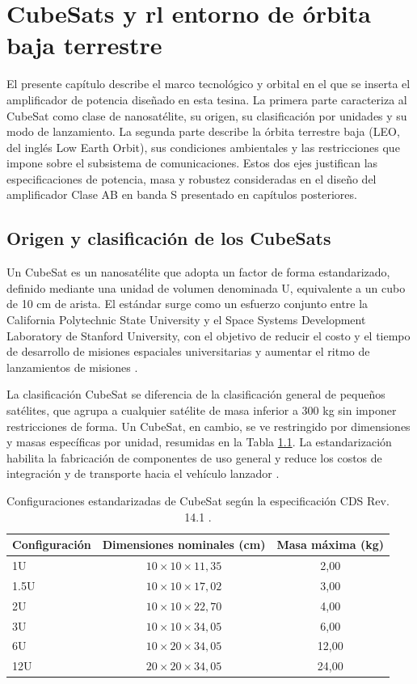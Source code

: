 \chapter{CubeSats y rl entorno de órbita baja terrestre} \label{chap:cubesat_leo}
El presente capítulo describe el marco tecnológico y orbital en el que se inserta el amplificador de potencia diseñado en esta tesina. La primera parte caracteriza al CubeSat como clase de nanosatélite, su origen, su clasificación por unidades y su modo de lanzamiento. La segunda parte describe la órbita terrestre baja (LEO, del inglés Low Earth Orbit), sus condiciones ambientales y las restricciones que impone sobre el subsistema de comunicaciones. Estos dos ejes justifican las especificaciones de potencia, masa y robustez consideradas en el diseño del amplificador Clase AB en banda S presentado en capítulos posteriores.

\section{Origen y clasificación de los CubeSats}
Un CubeSat es un nanosatélite que adopta un factor de forma estandarizado, definido mediante una unidad de volumen denominada U, equivalente a un cubo de 10 cm de arista. El estándar surge como un esfuerzo conjunto entre la California Polytechnic State University y el Space Systems Development Laboratory de Stanford University, con el objetivo de reducir el costo y el tiempo de desarrollo de misiones espaciales universitarias y aumentar el ritmo de lanzamientos de misiones \cite{cubesatspecs}.

La clasificación CubeSat se diferencia de la clasificación general de pequeños satélites, que agrupa a cualquier satélite de masa inferior a 300 kg sin imponer restricciones de forma. Un CubeSat, en cambio, se ve restringido por dimensiones y masas específicas por unidad, resumidas en la Tabla \ref{tab:cubesat_units}. La estandarización habilita la fabricación de componentes de uso general y reduce los costos de integración y de transporte hacia el vehículo lanzador \cite{nasa2017}.

\begin{table}[htbp]
    \centering
    \caption{Configuraciones estandarizadas de CubeSat según la especificación CDS Rev. 14.1 \cite{cubesatspecs}.}
    \label{tab:cubesat_units}
    \begin{tabular}{lcc}
        \hline\hline
        Configuración & Dimensiones nominales (cm) & Masa máxima (kg) \\
        \hline
        1U   & $10 \times 10 \times 11,35$ & 2,00  \\
        1.5U & $10 \times 10 \times 17,02$ & 3,00  \\
        2U   & $10 \times 10 \times 22,70$ & 4,00  \\
        3U   & $10 \times 10 \times 34,05$ & 6,00  \\
        6U   & $10 \times 20 \times 34,05$ & 12,00 \\
        12U  & $20 \times 20 \times 34,05$ & 24,00 \\
        \hline\hline
    \end{tabular}
\end{table}

